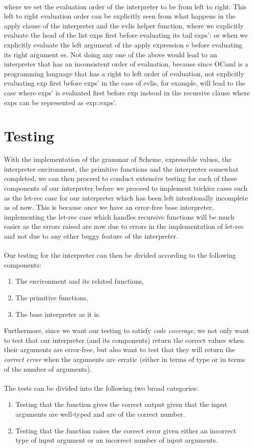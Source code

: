 \\
where we set the evaluation order of the interpreter to be from left to right. This left to right evaluation order can be explicitly seen from what happens in the apply clause of the interpreter and the evlis helper function, 
where we explicitly evaluate the head of the list exps first before evaluating its tail exps’; or when we explicitly evaluate the left argument of the apply expression e before evaluating its right argument es. Not doing 
any one of the above would lead to an interpreter that has an inconsistent order of evaluation, because since OCaml is a programming language that has a right to left order of evaluation, not explicitly evaluating exp 
first before exps’ in the case of evlis, for example, will lead to the case where exps’ is evaluated first before exp instead in the recursive clause where exps can be represented as exp::exps’.
\section{Testing}
With the implementation of the grammar of Scheme, expressible values, the interpreter environment, the primitive functions and the interpreter somewhat completed, we can then proceed to conduct extensive testing for each of 
these components of our interpreter before we proceed to implement trickier cases such as the let-rec case for our interpreter which has been left intentionally incomplete as of now. This is because once we have an error-free 
base interpreter, implementing the let-rec case which handles recursive functions will be much easier as the errors raised are now due to errors in the implementation of let-rec and not due to any other buggy feature of the 
interpreter.
\\
\\
Our testing for the interpreter can then be divided according to the following components:
\begin{enumerate}
   \item The environment and its related functions,
   \item The primitive functions,
   \item The base interpreter as it is.
\end{enumerate}
Furthermore, since we want our testing to satisfy \textit{code coverage}, we not only want to test that our interpreter (and its components) return the correct values when their arguments are error-free, but also want to 
test that they will return the \textit{correct error} when the arguments are erratic (either in terms of type or in terms of the number of arguments).
\\
\\
The tests can be divided into the following two broad categories:
\begin{enumerate}
   \item Testing that the function gives the correct output given that the input arguments are well-typed and are of the correct number.
   \item Testing that the function raises the correct error given either an incorrect type of input argument or an incorrect number of input arguments.
\end{enumerate}
